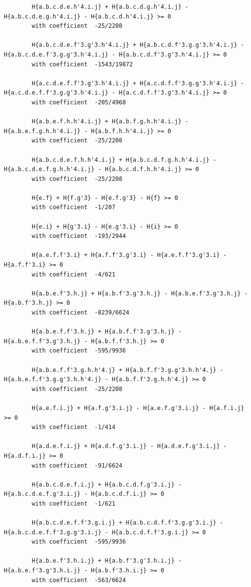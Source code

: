 \documentclass[11pt, a4paper]{kybernetika}
\begin{document}
\begin{verbatim}
		H{a.b.c.d.e.h'4.i.j} + H{a.b.c.d.g.h'4.i.j} - H{a.b.c.d.e.g.h'4.i.j} - H{a.b.c.d.h'4.i.j} >= 0
		with coefficient  -25/2208
		
		H{a.b.c.d.e.f'3.g'3.h'4.i.j} + H{a.b.c.d.f'3.g.g'3.h'4.i.j} - H{a.b.c.d.e.f'3.g.g'3.h'4.i.j} - H{a.b.c.d.f'3.g'3.h'4.i.j} >= 0
		with coefficient  -1543/19872
		
		H{a.c.d.e.f.f'3.g'3.h'4.i.j} + H{a.c.d.f.f'3.g.g'3.h'4.i.j} - H{a.c.d.e.f.f'3.g.g'3.h'4.i.j} - H{a.c.d.f.f'3.g'3.h'4.i.j} >= 0
		with coefficient  -205/4968
		
		H{a.b.e.f.h.h'4.i.j} + H{a.b.f.g.h.h'4.i.j} - H{a.b.e.f.g.h.h'4.i.j} - H{a.b.f.h.h'4.i.j} >= 0
		with coefficient  -25/2208
		
		H{a.b.c.d.e.f.h.h'4.i.j} + H{a.b.c.d.f.g.h.h'4.i.j} - H{a.b.c.d.e.f.g.h.h'4.i.j} - H{a.b.c.d.f.h.h'4.i.j} >= 0
		with coefficient  -25/2208
		
		H{e.f} + H{f.g'3} - H{e.f.g'3} - H{f} >= 0
		with coefficient  -1/207
		
		H{e.i} + H{g'3.i} - H{e.g'3.i} - H{i} >= 0
		with coefficient  -193/2944
		
		H{a.e.f.f'3.i} + H{a.f.f'3.g'3.i} - H{a.e.f.f'3.g'3.i} - H{a.f.f'3.i} >= 0
		with coefficient  -4/621
		
		H{a.b.e.f'3.h.j} + H{a.b.f'3.g'3.h.j} - H{a.b.e.f'3.g'3.h.j} - H{a.b.f'3.h.j} >= 0
		with coefficient  -8239/6624
		
		H{a.b.e.f.f'3.h.j} + H{a.b.f.f'3.g'3.h.j} - H{a.b.e.f.f'3.g'3.h.j} - H{a.b.f.f'3.h.j} >= 0
		with coefficient  -595/9936
		
		H{a.b.e.f.f'3.g.h.h'4.j} + H{a.b.f.f'3.g.g'3.h.h'4.j} - H{a.b.e.f.f'3.g.g'3.h.h'4.j} - H{a.b.f.f'3.g.h.h'4.j} >= 0
		with coefficient  -25/2208
		
		H{a.e.f.i.j} + H{a.f.g'3.i.j} - H{a.e.f.g'3.i.j} - H{a.f.i.j} >= 0
		with coefficient  -1/414
		
		H{a.d.e.f.i.j} + H{a.d.f.g'3.i.j} - H{a.d.e.f.g'3.i.j} - H{a.d.f.i.j} >= 0
		with coefficient  -91/6624
		
		H{a.b.c.d.e.f.i.j} + H{a.b.c.d.f.g'3.i.j} - H{a.b.c.d.e.f.g'3.i.j} - H{a.b.c.d.f.i.j} >= 0
		with coefficient  -1/621
		
		H{a.b.c.d.e.f.f'3.g.i.j} + H{a.b.c.d.f.f'3.g.g'3.i.j} - H{a.b.c.d.e.f.f'3.g.g'3.i.j} - H{a.b.c.d.f.f'3.g.i.j} >= 0
		with coefficient  -595/9936
		
		H{a.b.e.f'3.h.i.j} + H{a.b.f'3.g'3.h.i.j} - H{a.b.e.f'3.g'3.h.i.j} - H{a.b.f'3.h.i.j} >= 0
		with coefficient  -563/6624
		

\end{verbatim}
\end{document}
